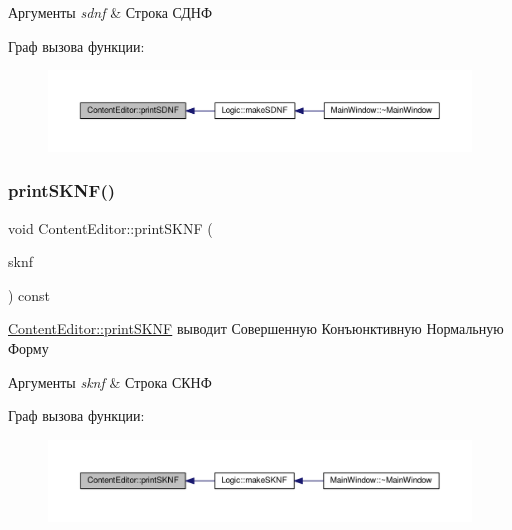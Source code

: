 \begin{DoxyParams}{Аргументы}
{\em sdnf} & Строка СДНФ \\
\hline
\end{DoxyParams}
Граф вызова функции\+:\nopagebreak
\begin{figure}[H]
\begin{center}
\leavevmode
\includegraphics[width=350pt]{class_content_editor_a929362122ef024a5b4ddc180f8af3423_icgraph}
\end{center}
\end{figure}
\mbox{\label{class_content_editor_a5492b3c4a67484e9b01322fd6b82870a}} 
\subsubsection{\texorpdfstring{print\+S\+K\+N\+F()}{printSKNF()}}
{\footnotesize\ttfamily void Content\+Editor\+::print\+S\+K\+NF (\begin{DoxyParamCaption}\item[{const Q\+String \&}]{sknf }\end{DoxyParamCaption}) const}



\hyperlink{class_content_editor_a5492b3c4a67484e9b01322fd6b82870a}{Content\+Editor\+::print\+S\+K\+NF} выводит Совершенную Конъюнктивную Нормальную Форму 


\begin{DoxyParams}{Аргументы}
{\em sknf} & Строка СКНФ \\
\hline
\end{DoxyParams}
Граф вызова функции\+:\nopagebreak
\begin{figure}[H]
\begin{center}
\leavevmode
\includegraphics[width=350pt]{class_content_editor_a5492b3c4a67484e9b01322fd6b82870a_icgraph}
\end{center}
\end{figure}
\mbox{\label{class_content_editor_a4244e9ccd627ab8146d74637837872e9}} 
